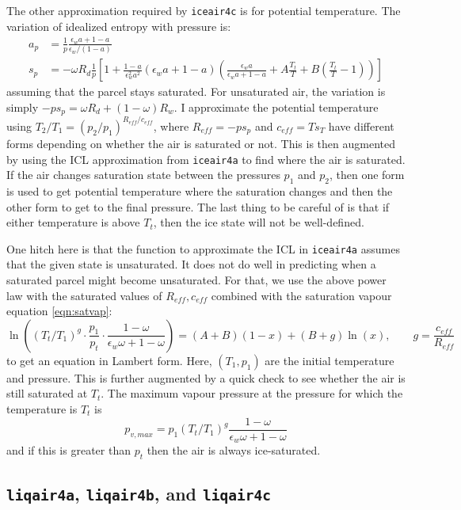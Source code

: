 \documentclass{article}
\newcommand{\epsw}{\epsilon_w}
\begin{document}
The other approximation required by \texttt{iceair4c} is for potential temperature. The variation of idealized entropy with pressure is:
\begin{align*}
    a_p &= \frac{1}{p} \frac{\epsw a + 1-a}{\epsw/(1-a)} \\
    s_p &= -\omega R_d \frac{1}{p} \left[ 1 + \frac{1-a}{\epsw^2 a^2} (\epsw a + 1-a) \left( \frac{\epsw a}{\epsw a + 1-a} + A \frac{T_t}{T} + B \left( \frac{T_t}{T} - 1 \right) \right) \right]
\end{align*}
assuming that the parcel stays saturated. For unsaturated air, the variation is simply $-p s_p = \omega R_d + (1-\omega) R_w$. I approximate the potential temperature using $T_2/T_1 = (p_2/p_1)^{R_{eff}/c_{eff}}$, where $R_{eff} = -p s_p$ and $c_{eff} = T s_T$ have different forms depending on whether the air is saturated or not. This is then augmented by using the ICL approximation from \texttt{iceair4a} to find where the air is saturated. If the air changes saturation state between the pressures $p_1$ and $p_2$, then one form is used to get potential temperature where the saturation changes and then the other form to get to the final pressure. The last thing to be careful of is that if either temperature is above $T_t$, then the ice state will not be well-defined.

One hitch here is that the function to approximate the ICL in \texttt{iceair4a} assumes that the given state is unsaturated. It does not do well in predicting when a saturated parcel might become unsaturated. For that, we use the above power law with the saturated values of $R_{eff}, c_{eff}$ combined with the saturation vapour equation \ref{eqn:satvap}:
\begin{equation*}
    \ln\left( (T_t/T_1)^g \cdot \frac{p_1}{p_t} \cdot \frac{1-\omega}{\epsw \omega + 1-\omega} \right) = (A+B) (1 - x) + (B+g) \ln(x), \qquad g = \frac{c_{eff}}{R_{eff}}
\end{equation*}
to get an equation in Lambert form. Here, $(T_1,p_1)$ are the initial temperature and pressure. This is further augmented by a quick check to see whether the air is still saturated at $T_t$. The maximum vapour pressure at the pressure for which the temperature is $T_t$ is
\begin{equation*}
    p_{v,max} = p_1 (T_t/T_1)^g \frac{1-\omega}{\epsw \omega + 1-\omega}
\end{equation*}
and if this is greater than $p_t$ then the air is always ice-saturated.


\subsection{\texttt{liqair4a}, \texttt{liqair4b}, and \texttt{liqair4c}}
\end{document}
